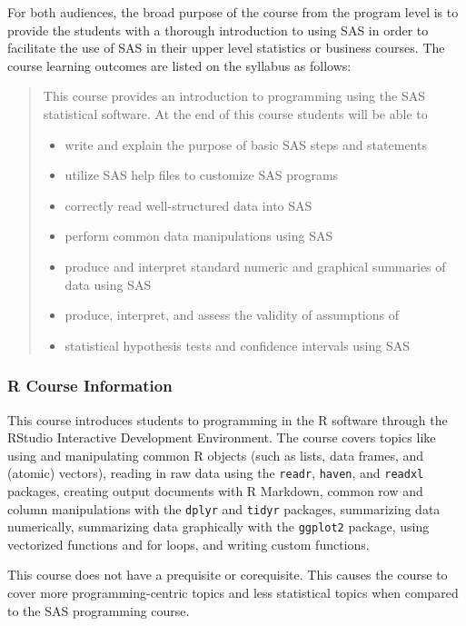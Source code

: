 \documentclass[
  letterpaper,
  DIV=11,
  numbers=noendperiod]{scrartcl}
\providecommand{\tightlist}{%
  \setlength{\itemsep}{0pt}\setlength{\parskip}{0pt}}\usepackage{longtable,booktabs,array}
\begin{document}
For both audiences, the broad purpose of the course from the program
level is to provide the students with a thorough introduction to using
SAS in order to facilitate the use of SAS in their upper level
statistics or business courses. The course learning outcomes are listed
on the syllabus as follows:

\begin{quote}
This course provides an introduction to programming using the SAS
statistical software. At the end of this course students will be able to

\begin{itemize}
\tightlist
\item
  write and explain the purpose of basic SAS steps and statements
\item
  utilize SAS help files to customize SAS programs
\item
  correctly read well-structured data into SAS
\item
  perform common data manipulations using SAS
\item
  produce and interpret standard numeric and graphical summaries of data
  using SAS
\item
  produce, interpret, and assess the validity of assumptions of
\item
  statistical hypothesis tests and confidence intervals using SAS
\end{itemize}
\end{quote}

\hypertarget{r-course-information}{%
\subsubsection{R Course Information}\label{r-course-information}}

This course introduces students to programming in the R software through
the RStudio Interactive Development Environment. The course covers
topics like using and manipulating common R objects (such as lists, data
frames, and (atomic) vectors), reading in raw data using the
\texttt{readr}, \texttt{haven}, and \texttt{readxl} packages, creating
output documents with R Markdown, common row and column manipulations
with the \texttt{dplyr} and \texttt{tidyr} packages, summarizing data
numerically, summarizing data graphically with the \texttt{ggplot2}
package, using vectorized functions and for loops, and writing custom
functions.

This course does not have a prequisite or corequisite. This causes the
course to cover more programming-centric topics and less statistical
topics when compared to the SAS programming course.
\end{document}
